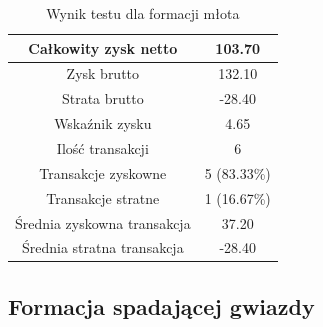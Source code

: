 \documentclass[pdflatex,11pt]{aghdpl}
\begin{document}
\begin{table}[h!]
\caption{Wynik testu dla formacji młota}
\begin{center}
\begin{tabular}{|c|c|}
\hline 
Całkowity zysk netto & 103.70 \\
\hline
Zysk brutto & 132.10 \\
\hline
Strata brutto & -28.40 \\
\hline
Wskaźnik zysku & 4.65 \\
\hline
\hline
Ilość transakcji & 6 \\
\hline
Transakcje zyskowne & 5 (83.33\%) \\
\hline
Transakcje stratne & 1 (16.67\%) \\
\hline
\hline
Średnia zyskowna transakcja & 37.20 \\
\hline
Średnia stratna transakcja & -28.40 \\
\hline
\end{tabular} 
\label{raport_mlot}
\end{center}
\end{table}

\subsection{Formacja spadającej gwiazdy}
\paragraph{}
\end{document}
